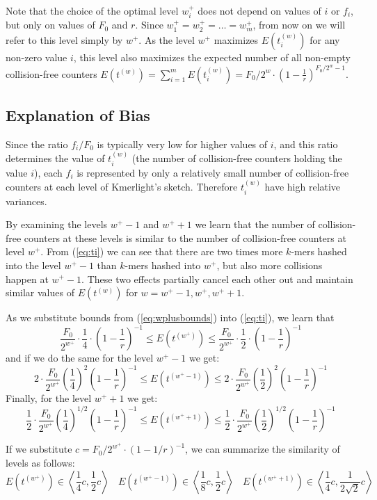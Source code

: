 \medskip

Note that the choice of the optimal level $w_i^+$ does not depend on values of $i$ or $f_i$,
but only on values of $F_0$ and $r$. Since $w_1^+ = w_2^+ = \dots = w_m^+$, from now on 
we will refer to this level simply by $w^+$.
As the level $w^+$ maximizes $E(t_i^{(w)})$ for any non-zero value $i$, 
this level also maximizes the expected number of all non-empty collision-free counters
$E(t^{(w)}) = \sum_{i=1}^m E(t_i^{(w)}) = F_0 / 2^w \cdot
\left(1 - \frac{1}{r}\right)^{F_0/2^w - 1} $.

\subsection{Explanation of Bias}
Since the ratio $f_i / F_0$ is typically very low for higher values of $i$, and this
ratio determines the value of $t_i^{(w)}$ (the number of collision-free counters holding
the value $i$), each $f_i$ is represented by only a relatively small number of collision-free
counters at each level of Kmerlight's sketch. Therefore $t_i^{(w)}$ have high relative variances. 

By examining the levels $w^+-1$ and $w^++1$ we learn that the number of collision-free
counters at these levels is similar to the number of collision-free counters at level $w^+$. 
From (\ref{eq:ti}) we can see that there are two times more $k$-mers hashed into the level $w^+-1$
than $k$-mers hashed into $w^+$, but also more collisions happen at $w^+-1$. These
two effects partially cancel each other out and maintain similar values of $E(t^{(w)})$
for $w = w^+-1, w^+, w^++1$.

As we substitute bounds from (\ref{eq:wplusbounds}) into (\ref{eq:ti}), we learn that
$$ 
\frac{F_0}{2^{w^+}} \cdot \frac{1}{4} \cdot \left(1 - \frac{1}{r}\right)^{-1}
\leq E(t^{(w^+)}) \leq 
\frac{F_0}{2^{w^+}} \cdot \frac{1}{2} \cdot \left(1 - \frac{1}{r}\right)^{-1}
$$
and if we do the same for the level $w^+-1$ we get:
$$ 
2 \cdot \frac{F_0}{2^{w^+}} \left(\frac{1}{4}\right)^2 \left(1 - \frac{1}{r}\right)^{-1}
\leq E(t^{(w^+-1)}) \leq 
2 \cdot \frac{F_0}{2^{w^+}} \left(\frac{1}{2}\right)^2 \left(1 - \frac{1}{r}\right)^{-1}
$$
Finally, for the level $w^++1$ we get:
$$ 
\frac{1}{2} \cdot \frac{F_0}{2^{w^+}} \left(\frac{1}{4}\right)^{1/2} \left(1 - \frac{1}{r}\right)^{-1}
\leq E(t^{(w^++1)}) \leq 
\frac{1}{2} \cdot \frac{F_0}{2^{w^+}} \left(\frac{1}{2}\right)^{1/2} \left(1 - \frac{1}{r}\right)^{-1}
$$


If we substitute $c = F_0/2^{w^+} \cdot (1-1/r)^{-1}$,
we can summarize the similarity of levels as follows:
\begin{equation} \label{eq:level-similarity}
E(t^{(w^+)}) \in \left\langle \frac{1}{4}c, \frac{1}{2}c  \right\rangle ~~~~
E(t^{(w^+-1)}) \in \left\langle \frac{1}{8}c, \frac{1}{2}c  \right\rangle ~~~~
E(t^{(w^++1)}) \in \left\langle \frac{1}{4}c,\frac{1}{2\sqrt{2}}c  \right\rangle
\end{equation}

